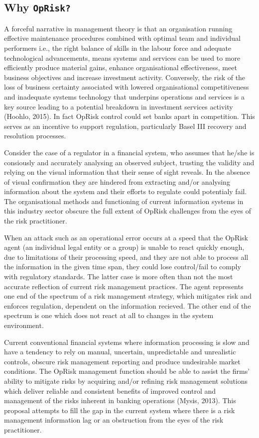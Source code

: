\documentclass[]{DissertateUSU}
\begin{document}
\subsection{Why \texttt{OpRisk?}}

A forceful narrative in management theory is that an organisation
running effective maintenance procedures combined with optimal team and
individual performers i.e., the right balance of skills in the labour
force and adequate technological advancements, means systems and
services can be used to more efficiently produce material gains, enhance
organisational effectiveness, meet business objectives and increase
investment activity. Conversely, the risk of the loss of business
certainty associated with lowered organisational competitiveness and
inadequate systems technology that underpins operations and services is
a key source leading to a potential breakdown in investment services
activity (Hoohlo, 2015). In fact OpRisk control could set banks apart in
competition. This serves as an incentive to support regulation,
particularly Basel III recovery and resolution processes.\medskip

Consider the case of a regulator in a financial system, who assumes that
he/she is consiously and accurately analysing an observed subject,
trusting the validity and relying on the visual information that their
sense of sight reveals. In the absence of visual confirmation they are
hindered from extracting and/or analysing information about the system
and their efforts to regulate could potentialy fail. The organisational
methods and functioning of current information systems in this industry
sector obscure the full extent of OpRisk challenges from the eyes of the
risk practitioner.\medskip 

When an attack such as an operational error occurs at a speed that the
OpRisk agent (an individual legal entity or a group) is unable to react
quickly enough, due to limitations of their processing speed, and they
are not able to process all the information in the given time span, they
could lose control/fail to comply with regulatory standards. The latter
case is more often than not the most accurate reflection of current risk
management practices. The agent represents one end of the spectrum of a
risk management strategy, which mitigates risk and enforces regulation,
dependent on the information recieved. The other end of the spectrum is
one which does not react at all to changes in the system
environment.\medskip 

Current conventional financial systems where information processing is
slow and have a tendency to rely on manual, uncertain, unpredictable and
unrealistic controls, obscure risk management reporting and produce
undesirable market conditions. The OpRisk management function should be
able to assist the firms' ability to mitigate risks by acquiring and/or
refining risk management solutions which deliver reliable and consistent
benefits of improved control and management of the risks inherent in
banking operations (Mysis, 2013). This proposal attempts to fill the gap
in the current system where there is a risk management information lag
or an obstruction from the eyes of the risk practitioner.
\end{document}
